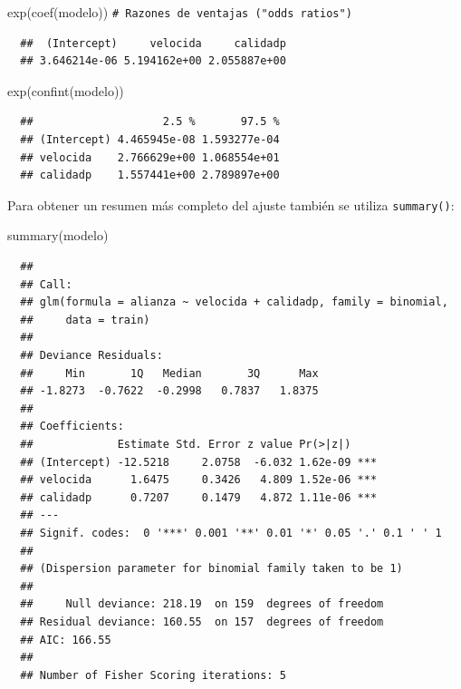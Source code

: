 \documentclass[
]{book}
\newenvironment{Shaded}{\begin{snugshade}}{\end{snugshade}}
\newcommand{\CommentTok}[1]{\textcolor[rgb]{0.56,0.35,0.01}{\textit{#1}}}
\newcommand{\FunctionTok}[1]{\textcolor[rgb]{0.00,0.00,0.00}{#1}}
\newcommand{\NormalTok}[1]{#1}
\theoremstyle{break}
\theoremstyle{nonumberplain}
\renewcommand{\CommentTok}[1]{\textcolor[rgb]{0.41,0.41,0.41}{\texttt{#1}}}
\begin{document}
\begin{Shaded}
\begin{Highlighting}[]
\FunctionTok{exp}\NormalTok{(}\FunctionTok{coef}\NormalTok{(modelo))  }\CommentTok{\# Razones de ventajas ("odds ratios")}
\end{Highlighting}
\end{Shaded}

\begin{verbatim}
  ##  (Intercept)     velocida     calidadp 
  ## 3.646214e-06 5.194162e+00 2.055887e+00
\end{verbatim}

\begin{Shaded}
\begin{Highlighting}[]
\FunctionTok{exp}\NormalTok{(}\FunctionTok{confint}\NormalTok{(modelo))}
\end{Highlighting}
\end{Shaded}

\begin{verbatim}
  ##                    2.5 %       97.5 %
  ## (Intercept) 4.465945e-08 1.593277e-04
  ## velocida    2.766629e+00 1.068554e+01
  ## calidadp    1.557441e+00 2.789897e+00
\end{verbatim}

Para obtener un resumen más completo del ajuste también se utiliza \texttt{summary()}:

\begin{Shaded}
\begin{Highlighting}[]
\FunctionTok{summary}\NormalTok{(modelo)}
\end{Highlighting}
\end{Shaded}

\begin{verbatim}
  ## 
  ## Call:
  ## glm(formula = alianza ~ velocida + calidadp, family = binomial, 
  ##     data = train)
  ## 
  ## Deviance Residuals: 
  ##     Min       1Q   Median       3Q      Max  
  ## -1.8273  -0.7622  -0.2998   0.7837   1.8375  
  ## 
  ## Coefficients:
  ##             Estimate Std. Error z value Pr(>|z|)    
  ## (Intercept) -12.5218     2.0758  -6.032 1.62e-09 ***
  ## velocida      1.6475     0.3426   4.809 1.52e-06 ***
  ## calidadp      0.7207     0.1479   4.872 1.11e-06 ***
  ## ---
  ## Signif. codes:  0 '***' 0.001 '**' 0.01 '*' 0.05 '.' 0.1 ' ' 1
  ## 
  ## (Dispersion parameter for binomial family taken to be 1)
  ## 
  ##     Null deviance: 218.19  on 159  degrees of freedom
  ## Residual deviance: 160.55  on 157  degrees of freedom
  ## AIC: 166.55
  ## 
  ## Number of Fisher Scoring iterations: 5
\end{verbatim}
\end{document}

